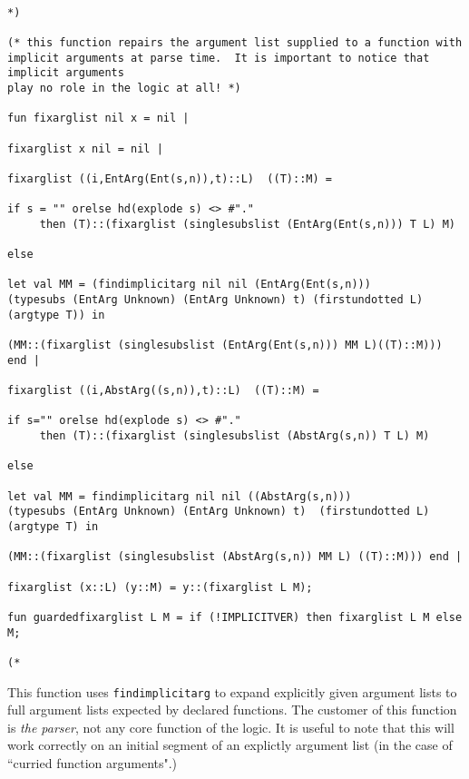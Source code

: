 \documentclass{article}
\begin{document}
\begin{verbatim}

*)

(* this function repairs the argument list supplied to a function with
implicit arguments at parse time.  It is important to notice that implicit arguments
play no role in the logic at all! *)

fun fixarglist nil x = nil |

fixarglist x nil = nil |

fixarglist ((i,EntArg(Ent(s,n)),t)::L)  ((T)::M) =

if s = "" orelse hd(explode s) <> #"." 
     then (T)::(fixarglist (singlesubslist (EntArg(Ent(s,n))) T L) M)

else 

let val MM = (findimplicitarg nil nil (EntArg(Ent(s,n))) 
(typesubs (EntArg Unknown) (EntArg Unknown) t) (firstundotted L) (argtype T)) in

(MM::(fixarglist (singlesubslist (EntArg(Ent(s,n))) MM L)((T)::M))) end |

fixarglist ((i,AbstArg((s,n)),t)::L)  ((T)::M) =

if s="" orelse hd(explode s) <> #"." 
     then (T)::(fixarglist (singlesubslist (AbstArg(s,n)) T L) M)

else 

let val MM = findimplicitarg nil nil ((AbstArg(s,n))) 
(typesubs (EntArg Unknown) (EntArg Unknown) t)  (firstundotted L) (argtype T) in

(MM::(fixarglist (singlesubslist (AbstArg(s,n)) MM L) ((T)::M))) end |

fixarglist (x::L) (y::M) = y::(fixarglist L M);

fun guardedfixarglist L M = if (!IMPLICITVER) then fixarglist L M else M;

(*

\end{verbatim}

This function uses {\tt findimplicitarg} to expand explicitly given argument lists to full argument lists expected by declared functions.  The customer of this function is {\em the parser\/}, not any core function of the logic.  It is useful to note that this will work correctly on an initial segment of an explictly argument list (in the case of ``curried function arguments".)
\end{document}
